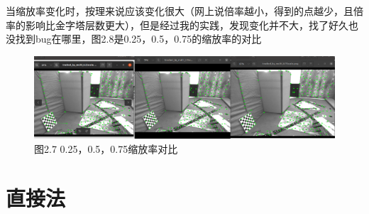 \documentclass[40pt,a4paper，UTF8]{ctexart}
\numberwithin{equation}{section}
\begin{document}
\begin{enumerate}
当缩放率变化时，按理来说应该变化很大（网上说倍率越小，得到的点越少，且倍率的影响比金字塔层数更大），但是经过我的实践，发现变化并不大，找了好久也没找到bug在哪里，图2.8是0.25，0.5，0.75的缩放率的对比
\begin{figure}[H]
\centering
\includegraphics[width=4.8in]{ch6_2_9.png} {图2.7  0.25，0.5，0.75缩放率对比}
\end{figure}

\end{enumerate}


\section{直接法}
\end{document}
